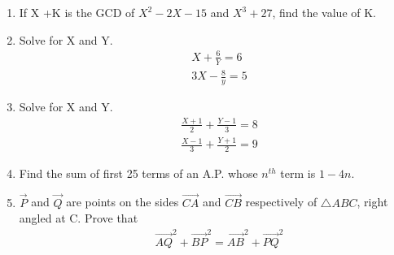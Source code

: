 \documentclass[journal,12pt,twocolumn]{IEEEtran}
\begin{document}
\begin{enumerate}
\item If X +K is the GCD of $ X^2-2X-15 $ and $X^3+27$, find the value of K.
\item Solve for X and Y.\\ 
\begin{align}
&X+\displaystyle\frac{6}{Y}=6 \nonumber\\
&3X- \displaystyle\frac{8}{y}=5 \nonumber
 \end{align}
 
\item Solve for  X and Y.\\ 
\begin{align}
& \displaystyle\frac{X+1}{2}+\displaystyle\frac{Y-1}{3}=8 \nonumber\\
& \displaystyle\frac{X-1}{3}+\displaystyle\frac{Y+1}{2}=9 \nonumber
\end{align}

\item Find the sum of first 25 terms of an A.P. whose $n^{th} $ term is $1-4n$.
\item $\vec{P}$  and $\vec{Q}$ are points on the sides $\vec{CA}$ and $\vec{CB}$ respectively of $\triangle{ABC}$, right angled at C. Prove that
\begin{align}
&\vec{AQ}^2+ \vec{BP}^2= \vec{AB}^2+\vec{PQ}^2 \nonumber
\end{align}


\end{enumerate}
\end{document}
